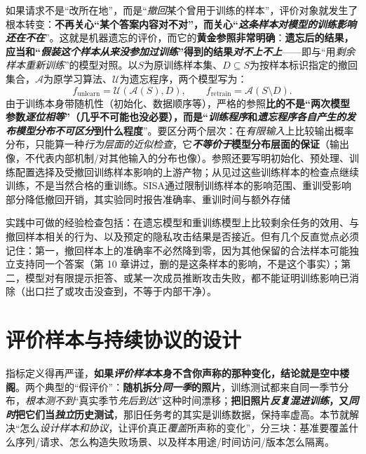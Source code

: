 如果请求不是“改所在地”，而是“\emph{撤回}某个曾用于训练的样本”，评价对象就发生了根本转变：\textbf{不再关心“某个答案内容对不对”，而关心“\emph{这条样本对模型的\emph{训练影响}还在不在}}”。这就是机器遗忘的评价，而它的\textbf{黄金参照非常明确}：\textbf{遗忘后的结果，应当和“\emph{假装这个样本\emph{从来没参加过}训练}”得到的结果\emph{对不上不上}}——即与“用\emph{剩余样本重新训练}”的模型对照。以$S$为原训练样本集、$D\subseteq S$为按样本标识指定的撤回集合，$\mathcal A$为原学习算法、$\mathcal U$为遗忘程序，两个模型写为：
\begin{equation}
  f_{\mathrm{unlearn}}=\mathcal U(\mathcal A(S),D),
  \qquad f_{\mathrm{retrain}}=\mathcal A(S\setminus D).
  \label{eq:ket-evaluation-unlearning-reference}
\end{equation}
由于训练本身带随机性（初始化、数据顺序等），严格的参照\textbf{比的不是“两次模型参数\emph{逐位相等}”（几乎不可能也没必要），而是“\emph{训练程序}和\emph{遗忘程序}\emph{各自产生的\emph{发布模型\emph{分布}}}\emph{不可区分}到什么程度}”。要区分两个层次：在\emph{有限输入}上比较输出概率分布，只能算一种\emph{行为层面的近似检查}，它\textbf{\emph{不等价于}模型分布层面的保证}（输出像，不代表内部机制/对其他输入的分布也像）。参照还要写明初始化、预处理、训练配置选择及受撤回训练样本影响的上游产物；从见过这些训练样本的检查点继续训练，不是当然合格的重训练。SISA通过限制训练样本的影响范围、重训受影响部分降低撤回开销，其实验同时报告准确率、重训时间与额外存储

实践中可做的经验检查包括：在遗忘模型和重训练模型上比较剩余任务的效用、与撤回样本相关的行为、以及预定的隐私攻击结果是否接近。但有几个反直觉点必须记住：第一，撤回样本上的准确率不必然降到零，因为其他保留的合法样本可能独立支持同一个答案（第 10 章讲过，删的是这条样本的影响，不是这个事实）；第二，模型对有限提示拒答、或某一次成员推断攻击失败，都不能证明训练影响已消除（出口拦了或攻击没查到，不等于内部干净）。


\section{评价样本与持续协议的设计}
\label{sec:ket-evolution-evaluation-protocol}

指标定义得再严谨，\textbf{如果\emph{评价样本}本身不含你声称的那种变化，结论就是空中楼阁}。两个典型的“假评价”：\textbf{随机拆分\emph{同一季}的照片}，训练测试都来自同一季节分布，\emph{根本测不到}“真实季节\emph{先后到达}”这种时间漂移；\textbf{把旧照片\emph{反复混进训练}，又\emph{同时}把它们当\emph{独立}历史测试}，那旧任务考的其实是训练数据，保持率虚高。本节就解决“怎么\emph{设计样本和协议}，让评价真正\emph{覆盖}所声称的变化”，分三块：基准要覆盖什么序列/请求、怎么构造失败场景、以及样本用途/时间访问/版本怎么隔离。

